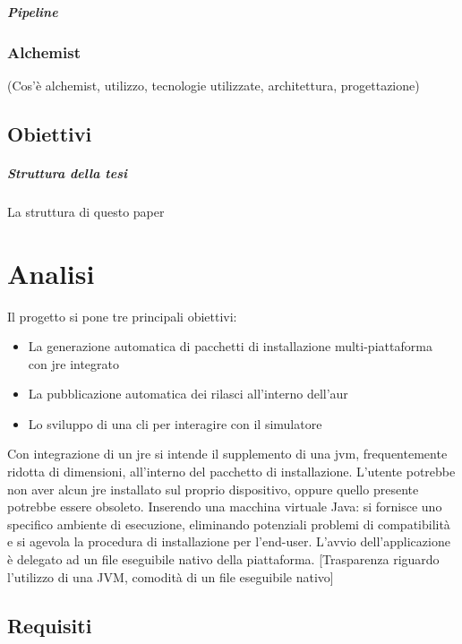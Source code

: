 \documentclass[12pt,a4paper,openright,twoside]{book}
\begin{document}
\paragraph{Pipeline}

\subsection{Alchemist}

(Cos'è alchemist, utilizzo, tecnologie utilizzate, architettura, progettazione)

\section{Obiettivi}

\paragraph{Struttura della tesi}

La struttura di questo paper

\chapter{Analisi}

Il progetto si pone tre principali obiettivi:
\begin{itemize}
	\setlength\itemsep{0.8em}
	\item La generazione automatica di pacchetti di installazione multi-piattaforma \\ con \ac{jre} integrato
	\item La pubblicazione automatica dei rilasci all'interno dell'\ac{aur}
	\item Lo sviluppo di una \ac{cli} per interagire con il simulatore
\end{itemize}
Con integrazione di un \ac{jre} si intende il supplemento di una \ac{jvm}, frequentemente ridotta di dimensioni, all'interno del pacchetto di installazione.
L'utente potrebbe non aver alcun \ac{jre} installato sul proprio dispositivo, oppure quello presente potrebbe essere obsoleto. Inserendo una macchina virtuale Java: si fornisce uno specifico ambiente di esecuzione, eliminando potenziali problemi di compatibilità e si agevola la procedura di installazione per l'end-user. L'avvio dell'applicazione è delegato ad un file eseguibile nativo della piattaforma. [Trasparenza riguardo l'utilizzo di una JVM, comodità di un file eseguibile nativo]

\section{Requisiti}
\end{document}
